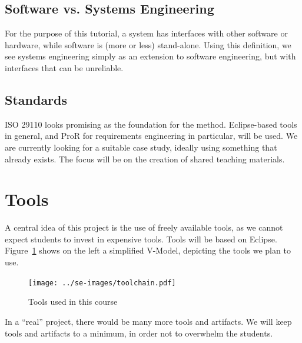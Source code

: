 \subsection{Software vs. Systems Engineering}

For the purpose of this tutorial, a system has interfaces with other software or hardware, while software is (more or less) stand-alone.  Using this definition, we see systems engineering simply as an extension to software engineering, but with interfaces that can be unreliable.

\subsection{Standards}

ISO 29110 looks promising as the foundation for the method. Eclipse-based tools in general, and ProR for requirements engineering in particular, will be used. We are currently looking for a suitable case study, ideally using something that already exists. The focus will be on the creation of shared teaching materials. 

\section{Tools}

A central idea of this project is the use of freely available tools, as we cannot expect students to invest in expensive tools.  Tools will be based on Eclipse.  Figure~\ref{fig:v-model} shows on the left a simplified V-Model, depicting the tools we plan to use.

\begin{figure}[h!]
  \centering
  \texttt{[image: ../se-images/toolchain.pdf]}
  \caption{Tools used in this course}
  \label{fig:v-model}
\end{figure}

\begin{info}
In a ``real'' project, there would be many more tools and artifacts.  We will keep tools and artifacts to a minimum, in order not to overwhelm the students.
\end{info}


